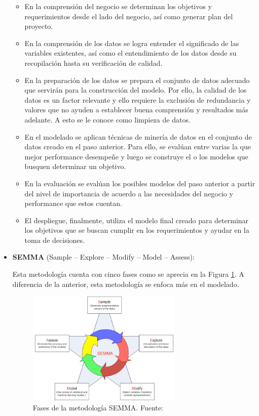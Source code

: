\begin{itemize}
	\begin{itemize}
		\item En la comprensión del negocio se determinan los objetivos y requerimientos desde el lado del negocio, así como generar plan del proyecto.
		\item En la comprensión de los datos se logra entender el significado de las variables existentes, así como el entendimiento de los datos desde su recopilación hasta su verificación de calidad.
		\item En la preparación de los datos se prepara el conjunto de datos adecuado que servirán para la construcción del modelo. Por ello, la calidad de los datos es un factor relevante y ello requiere la exclusión de redundancia y valores que no ayuden a establecer buena comprensión y resultados más adelante. A esto se le conoce como limpieza de datos.
		\item En el modelado se aplican técnicas de minería de datos en el conjunto de datos creado en el paso anterior. Para ello, se evalúan entre varias la que mejor performance desempeñe y luego se construye el o los modelos que busquen determinar un objetivo.
		\item En la evaluación se evalúan los posibles modelos del paso anterior a partir del nivel de importancia de acuerdo a las necesidades del negocio y performance que estos cuentan.
		\item El despliegue, finalmente, utiliza el modelo final creado para determinar los objetivos que se buscan cumplir en los requerimientos y ayudar en la toma de decisiones.
	\end{itemize}
	
	\item \textbf{SEMMA} (Sample – Explore – Modify – Model – Assess):
	
	Esta metodología cuenta con cinco fases como se aprecia en la Figura \ref{2:fig8}. A diferencia de la anterior, esta metodología se enfoca más en el modelado.
	\begin{figure}[h]
		\begin{center}
			\includegraphics[width=0.70\textwidth]{2/figures/semma.jpg}
			\caption[Fases de la metodología SEMMA]{Fases de la metodología SEMMA. Fuente: \cite{tec_braulio2015metodologiasdm}}
			\label{2:fig8}
		\end{center}
	\end{figure}
	

\end{itemize}
